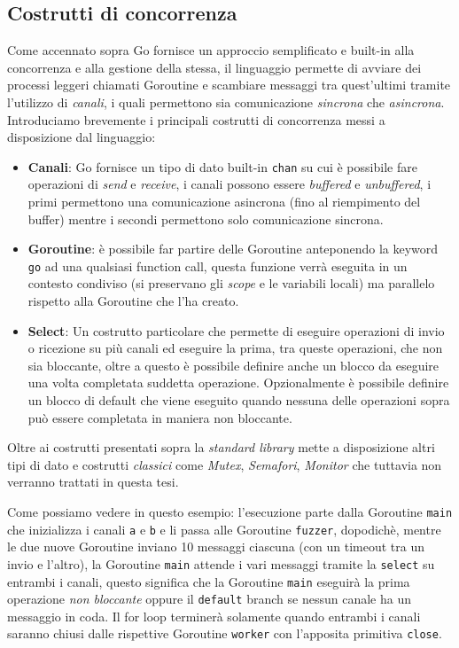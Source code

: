 \subsection{Costrutti di concorrenza}
Come accennato sopra Go fornisce un approccio semplificato e built-in alla concorrenza e alla gestione della stessa, il linguaggio permette di avviare dei processi leggeri chiamati Goroutine e scambiare messaggi tra quest'ultimi tramite l'utilizzo di \emph{canali}, i quali permettono sia comunicazione \emph{sincrona} che \emph{asincrona}.\\
Introduciamo brevemente i principali costrutti di concorrenza messi a disposizione dal linguaggio:
\begin{itemize}
    \item \textbf{Canali}: Go fornisce un tipo di dato built-in \texttt{chan} su cui è possibile fare operazioni di \emph{send} e \emph{receive}, i canali possono essere \emph{buffered} e \emph{unbuffered}, i primi permettono una comunicazione asincrona (fino al riempimento del buffer) mentre i secondi permettono solo comunicazione sincrona.
    \item \textbf{Goroutine}: è possibile far partire delle Goroutine anteponendo la keyword \texttt{go} ad una qualsiasi function call, questa funzione verrà eseguita in un contesto condiviso (si preservano gli \emph{scope} e le variabili locali) ma parallelo rispetto alla Goroutine che l'ha creato.
    \item \textbf{Select}: Un costrutto particolare che permette di eseguire operazioni di invio o ricezione su più canali ed eseguire la prima, tra queste operazioni, che non sia bloccante, oltre a questo è possibile definire anche un blocco da eseguire una volta completata suddetta operazione. Opzionalmente è possibile definire un blocco di default che viene eseguito quando nessuna delle operazioni sopra può essere completata in maniera non bloccante.
\end{itemize}
Oltre ai costrutti presentati sopra la \emph{standard library} mette a disposizione altri tipi di dato e costrutti \emph{classici} come \emph{Mutex}, \emph{Semafori}, \emph{Monitor} che tuttavia non verranno trattati in questa tesi.
\newpage %

\bigskip
Come possiamo vedere in questo esempio: l'esecuzione parte dalla Goroutine \texttt{main} che inizializza i canali \texttt{a} e \texttt{b} e li passa alle Goroutine \texttt{fuzzer}, dopodichè, mentre le due nuove Goroutine inviano 10 messaggi ciascuna (con un timeout tra un invio e l'altro), la Goroutine \texttt{main} attende i vari messaggi tramite la \texttt{select} su entrambi i canali, questo significa che la Goroutine \texttt{main} eseguirà la prima operazione \emph{non bloccante} oppure il \texttt{default} branch se nessun canale ha un messaggio in coda. Il for loop terminerà solamente quando entrambi i canali saranno chiusi dalle rispettive Goroutine \texttt{worker} con l'apposita primitiva \texttt{close}.

